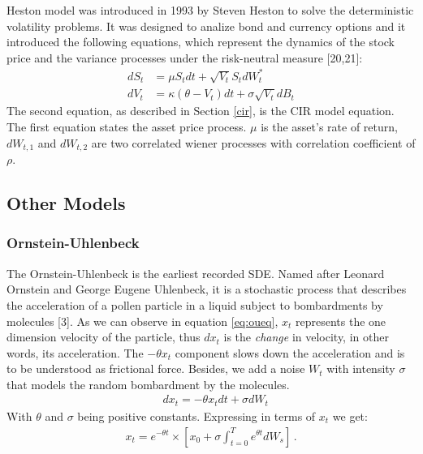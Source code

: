 \documentclass[12pt,twoside]{reedthesis}
\theoremstyle{definition}
\theoremstyle{definition}
\theoremstyle{remark}
\begin{document}
  Heston model was introduced in 1993 by Steven Heston to solve the
  deterministic volatility problems. It was designed to analize bond and
  currency options and it introduced the following equations, which
  represent the dynamics of the stock price and the variance processes
  under the risk-neutral measure {[}20,21{]}:
  \begin{align}
  \label{eq:heston}
  dS_t &= \mu S_t dt + \sqrt{V_t} S_t dW^*_t \\
  dV_t &=  \kappa (\theta - V_t)dt + \sigma \sqrt{V_t} dB_t
  \label{eq:hesvar}
  \end{align}
  The second equation, as described in Section \ref{cir}, is the CIR model
  equation. The first equation states the asset price process. \(\mu\) is
  the asset's rate of return, \(dW_{t,1}\) and \(dW_{t,2}\) are two
  correlated wiener processes with correlation coefficient of \(\rho\).
  
  \subsection{Other Models}\label{other-models}
  
  \subsubsection{Ornstein-Uhlenbeck}\label{ornstein-uhlenbeck}
  
  The Ornstein-Uhlenbeck is the earliest recorded SDE. Named after Leonard
  Ornstein and George Eugene Uhlenbeck, it is a stochastic process that
  describes the acceleration of a pollen particle in a liquid subject to
  bombardments by molecules {[}3{]}. As we can observe in equation
  \eqref{eq:oueq}, \(x_t\) represents the one dimension velocity of the
  particle, thus \(dx_t\) is the \emph{change} in velocity, in other
  words, its acceleration. The \(- \theta x_t\) component slows down the
  acceleration and is to be understood as frictional force. Besides, we
  add a noise \(W_t\) with intensity \(\sigma\) that models the random
  bombardment by the molecules.
  \begin{align} 
  \label{eq:oueq}
  &d x_t = - \theta x_t dt + \sigma d W_t
  \end{align}
  With \(\theta\) and \(\sigma\) being positive constants. Expressing in
  terms of \(x_t\) we get:
  \begin{align}
  x_t = e^{-\theta t} \times \left[ x_0  + \sigma \int_{t=0}^{T} e^{\theta t} d W_s \right] \,.
  \end{align}
\end{document}
